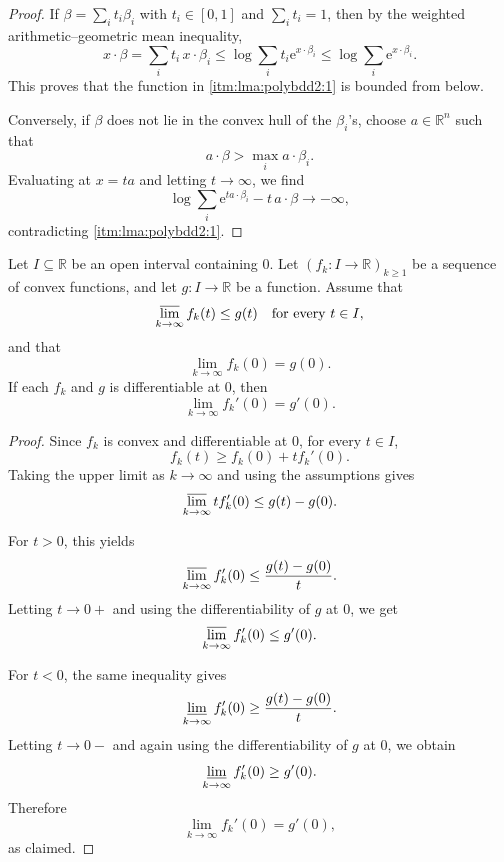 \begin{proof}
		If $\beta=\sum_i t_i\beta_i$ with $t_i\in[0,1]$ and $\sum_i t_i=1$, then by the weighted arithmetic--geometric mean inequality,
        \[
        x\cdot\beta=\sum_i t_i\,x\cdot\beta_i
        \leq \log\sum_i t_i\mathrm{e}^{x\cdot\beta_i}
        \leq \log\sum_i \mathrm{e}^{x\cdot\beta_i}.
        \]
        This proves that the function in \ref{itm:lma:polybdd2:1} is bounded from below.

        Conversely, if $\beta$ does not lie in the convex hull of the $\beta_i$'s, choose $a\in\mathbb{R}^n$ such that
        \[
        a\cdot\beta>\max_i a\cdot\beta_i.
        \]
        Evaluating at $x=ta$ and letting $t\to\infty$, we find
        \[
        \log \sum_i \mathrm{e}^{t a\cdot\beta_i}-t\,a\cdot\beta\to-\infty,
        \]
        contradicting \ref{itm:lma:polybdd2:1}.
\end{proof}

\begin{lemma}\label{lma:conc_lim_der}
    Let $I\subseteq \mathbb{R}$ be an open interval containing $0$. Let $(f_k\colon I\rightarrow \mathbb{R})_{k\geq 1}$ be a sequence of convex functions, and let $g\colon I\to \mathbb{R}$ be a function. Assume that
    \[
        \varlimsup_{k\to\infty} f_k(t)\leq g(t)\quad \text{for every } t\in I,
    \]
    and that
    \[
        \lim_{k\to\infty} f_k(0)=g(0).
    \]
    If each $f_k$ and $g$ is differentiable at $0$, then
    \[
        \lim_{k\to\infty} f_k'(0)=g'(0).
    \]
\end{lemma}
\begin{proof}
    Since $f_k$ is convex and differentiable at $0$, for every $t\in I$,
    \[
        f_k(t)\geq f_k(0)+t f_k'(0).
    \]
    Taking the upper limit as $k\to\infty$ and using the assumptions gives
    \[
        \varlimsup_{k\to\infty} t f_k'(0)
        \leq g(t)-g(0).
    \]

    For $t>0$, this yields
    \[
        \varlimsup_{k\to\infty} f_k'(0)
        \leq \frac{g(t)-g(0)}{t}.
    \]
    Letting $t\to 0+$ and using the differentiability of $g$ at $0$, we get
    \[
        \varlimsup_{k\to\infty} f_k'(0)\leq g'(0).
    \]

    For $t<0$, the same inequality gives
    \[
        \varliminf_{k\to\infty} f_k'(0)
        \geq \frac{g(t)-g(0)}{t}.
    \]
    Letting $t\to 0-$ and again using the differentiability of $g$ at $0$, we obtain
    \[
        \varliminf_{k\to\infty} f_k'(0)\geq g'(0).
    \]
    Therefore
    \[
        \lim_{k\to\infty} f_k'(0)=g'(0),
    \]
    as claimed.
\end{proof}
